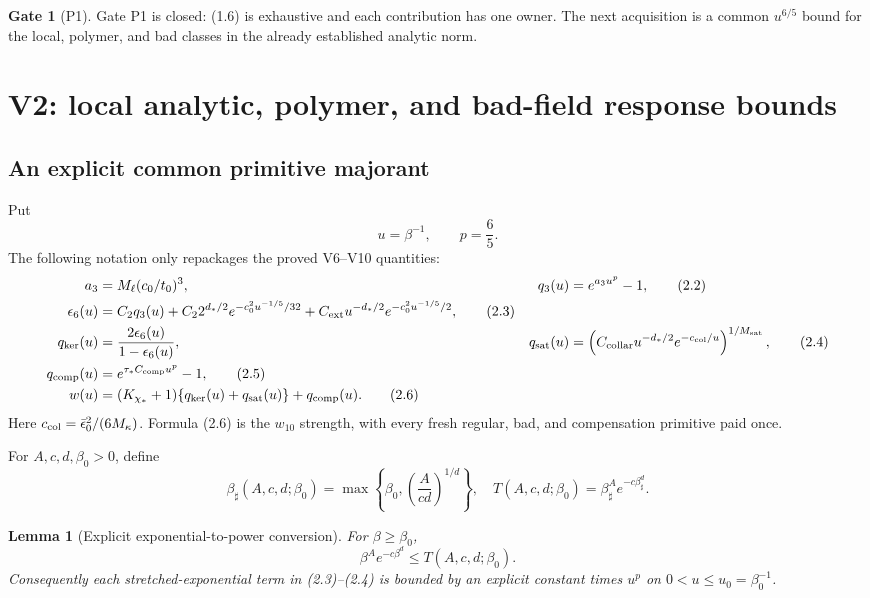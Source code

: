 \documentclass[11pt]{article}
\newtheorem{lemma}[theorem]{Lemma}
\theoremstyle{definition}
\newtheorem{gate}[theorem]{Gate}
\theoremstyle{remark}
\begin{document}
\begin{gate}[P1]
Gate P1 is closed: (1.6) is exhaustive and each contribution has one owner.
The next acquisition is a common $u^{6/5}$ bound for the local, polymer, and
bad classes in the already established analytic norm.
\end{gate}

\section{V2: local analytic, polymer, and bad-field response bounds}

\subsection{An explicit common primitive majorant}

Put
\[
 u=\beta^{-1},\qquad p=\frac65.                              \tag{2.1}
\]
The following notation only repackages the proved V6--V10 quantities:
\begin{align}
 a_3&=M_\ell(c_0/t_0)^3,
 &q_3(u)&=e^{a_3u^p}-1,                                      \tag{2.2}\\
 \epsilon_6(u)&=C_2q_3(u)
 +C_2 2^{d_*/2}e^{-c_0^2u^{-1/5}/32}
 +C_{\rm ext}u^{-d_*/2}e^{-c_0^2u^{-1/5}/2},                \tag{2.3}\\
 q_{\rm ker}(u)&=\frac{2\epsilon_6(u)}{1-\epsilon_6(u)},
 &q_{\rm sat}(u)&=
 \left(C_{\rm collar}u^{-d_*/2}e^{-c_{\rm col}/u}\right)^{1/M_{\rm sat}},
                                                                    \tag{2.4}\\
 q_{\rm comp}(u)&=e^{\tau_*C_{\rm comp}u^p}-1,              \tag{2.5}\\
 w(u)&=(K_{\chi_*}+1)\{q_{\rm ker}(u)+q_{\rm sat}(u)\}
       +q_{\rm comp}(u).                                     \tag{2.6}
\end{align}
Here $c_{\rm col}=\bar\epsilon_0^2/(6M_\kappa)$.  Formula (2.6)
is the $w_{10}$ strength, with every fresh regular, bad, and compensation
primitive paid once.

For $A,c,d,\beta_0>0$, define
\[
 \beta_\sharp(A,c,d;\beta_0)
 =\max\left\{\beta_0,\left(\frac{A}{cd}\right)^{1/d}\right\},
 \quad
 T(A,c,d;\beta_0)=\beta_\sharp^A e^{-c\beta_\sharp^d}.     \tag{2.7}
\]

\begin{lemma}[Explicit exponential-to-power conversion]
\label{lem:exp-power}
For $\beta\ge\beta_0$,
\[
 \beta^A e^{-c\beta^d}\le T(A,c,d;\beta_0).                \tag{2.8}
\]
Consequently each stretched-exponential term in (2.3)--(2.4) is
bounded by an explicit constant times $u^p$ on
$0<u\le u_0=\beta_0^{-1}$.
\end{lemma}
\end{document}
